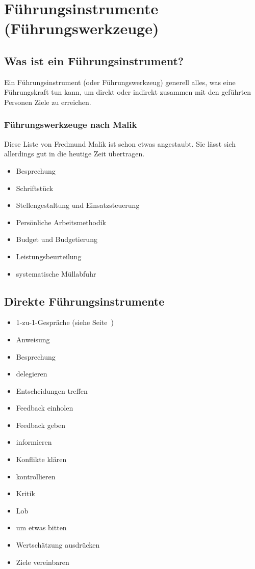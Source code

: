 \section{Führungsinstrumente (Führungswerkzeuge)}
\label{fuehrungsinstrumente}


\subsection{Was ist ein Führungsinstrument?}

Ein Führungsinstrument (oder Führungswerkzeug) generell alles, was eine Führungskraft tun kann, um direkt oder indirekt zusammen mit den geführten Personen Ziele zu erreichen.


\subsubsection{Führungswerkzeuge nach Malik}

Diese Liste von Fredmund Malik \cite{malik-fuehrung} ist schon etwas angestaubt. Sie lässt sich allerdings gut in die heutige Zeit übertragen.

\begin{itemize}
  \item Besprechung
  \item Schriftstück
  \item Stellengestaltung und Einsatzsteuerung
  \item Persönliche Arbeitsmethodik
  \item Budget und Budgetierung
  \item Leistungsbeurteilung
  \item systematische Müllabfuhr
\end{itemize}


\subsection{Direkte Führungsinstrumente}

\begin{itemize}
  \item 1-zu-1-Gespräche (siehe Seite~\pageref{1-zu-1})
  \item Anweisung
  \item Besprechung
  \item delegieren
  \item Entscheidungen treffen
  \item Feedback einholen
  \item Feedback geben
  \item informieren
  \item Konflikte klären
  \item kontrollieren
  \item Kritik
  \item Lob
  \item um etwas bitten
  \item Wertschätzung ausdrücken
  \item Ziele vereinbaren
\end{itemize}


